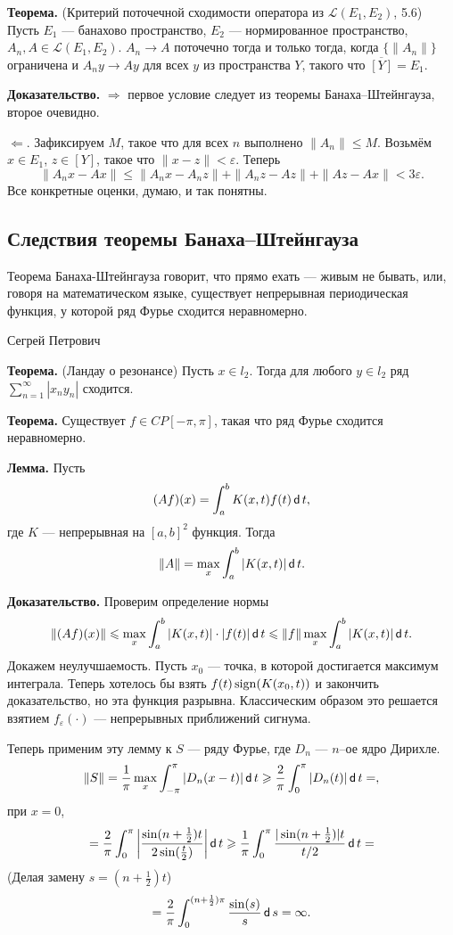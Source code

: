 \QED

\textbf{Теорема.} (Критерий поточечной сходимости оператора из $\mathcal L(E_1, E_2)$, 5.6)
Пусть $E_1$ --- банахово пространство, $E_2$ --- нормированное пространство, $A_n, A \in \mathcal L(E_1, E_2)$.
$A_n \to A$ поточечно тогда и только тогда, когда $\{\|A_n\|\}$ ограничена и $A_n y \to Ay$ для всех $y$ из пространства $Y$, такого что $\overline{[Y]} = E_1$.

\textbf{Доказательство.} $\Rightarrow$ первое условие следует из теоремы Банаха--Штейнгауза, второе очевидно.

$\Leftarrow$. Зафиксируем $M$, такое что для всех $n$ выполнено $\|A_n\| \le M$.
Возьмём $x \in E_1$, $z \in [Y]$, такое что $\|x - z\| < \varepsilon$.
Теперь
\[
    \|A_n x - Ax \| \le \|A_n x - A_n z\| + \|A_n z - Az \| + \|Az - Ax\| < 3 \varepsilon.
\]
Все конкретные оценки, думаю, и так понятны.

\QED

\subsection{Следствия теоремы Банаха--Штейнгауза}
\epigraph{Теорема Банаха-Штейнгауза говорит, что прямо ехать --- живым не бывать, или, говоря на математическом языке, существует непрерывная периодическая функция, у которой ряд Фурье сходится неравномерно.}{Сегрей Петрович}

\textbf{Теорема.} (Ландау о резонансе) Пусть $x \in l_2$.
Тогда для любого $y \in l_2$ ряд $\sum_{n=1}^{\infty} |x_n y_n|$ сходится.

\textbf{Теорема.} Существует $f \in CP[-\pi, \pi]$, такая что ряд Фурье сходится неравномерно.

\textbf{Лемма.} Пусть
\[
    (Af)(x) = \int_{a}^b K(x, t) f(t) \operatorname{\mathsf d} t,
\]
где $K$ --- непрерывная на $[a, b]^2$ функция.
Тогда
\[
    \|A\| = \max_x \int_a^b |K(x, t)| \operatorname{\mathsf d} t.
\]

\textbf{Доказательство.} Проверим определение нормы
\[
    \|(Af)(x)\| \leqslant \max_x \int_a^b |K(x, t)| \cdot |f(t)| \operatorname{\mathsf d} t \leqslant \|f\| \max_x \int_a^b |K(x, t)| \operatorname{\mathsf d} t.
\]
Докажем неулучшаемость.
Пусть $x_0$ --- точка, в которой достигается максимум интеграла.
Теперь хотелось бы взять $f(t) \operatorname{sign}(K(x_0, t))$ и закончить доказательство, но эта функция разрывна.
Классическим образом это решается взятием $f_{\varepsilon}(\cdot)$ --- непрерывных приближений сигнума.

\QED

Теперь применим эту лемму к $S$ --- ряду Фурье, где $D_n$ --- $n$--ое ядро Дирихле.
\[
    \|S\| = \frac{1}{\pi} \max_x \int_{-\pi}^\pi |D_n(x - t)| \operatorname{\mathsf d} t \geqslant \frac{2}{\pi} \int_0^\pi |D_n(t)| \operatorname{\mathsf d} t =,
\]
при $x = 0$,
\[
    = \frac{2}{\pi} \int_0^\pi \left| \frac{\sin(n + \frac{1}{2})t}{2\sin(\frac{t}{2})} \right| \operatorname{\mathsf d} t \geqslant \frac{1}{\pi} \int_0^\pi \frac{|\sin(n + \frac{1}{2})| t}{t/2} \operatorname{\mathsf d} t =
\]
(Делая замену $s = (n + \frac{1}{2}) t$)
\[
    = \frac{2}{\pi} \int_0^{(n + \frac{1}{2}) \pi} \frac{\sin(s)}{s} \operatorname{\mathsf d} s = \infty.
\]

